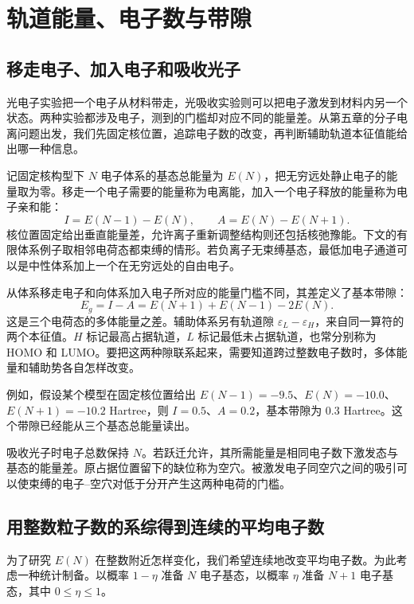 \chapter{轨道能量、电子数与带隙}
\section{移走电子、加入电子和吸收光子}
光电子实验把一个电子从材料带走，光吸收实验则可以把电子激发到材料内另一个状态。两种实验都涉及电子，测到的门槛却对应不同的能量差。从第五章的分子电离问题出发，我们先固定核位置，追踪电子数的改变，再判断辅助轨道本征值能给出哪一种信息。

记固定核构型下 $N$ 电子体系的基态总能量为 $E(N)$，把无穷远处静止电子的能量取为零。移走一个电子需要的能量称为电离能，加入一个电子释放的能量称为电子亲和能：
\begin{equation}
I=E(N-1)-E(N),\qquad A=E(N)-E(N+1).
\end{equation}
核位置固定给出垂直能量差，允许离子重新调整结构则还包括核弛豫能。下文的有限体系例子取相邻电荷态都束缚的情形。若负离子无束缚基态，最低加电子通道可以是中性体系加上一个在无穷远处的自由电子。

从体系移走电子和向体系加入电子所对应的能量门槛不同，其差定义了基本带隙：
\begin{equation}\label{spectra:gap}
E_g=I-A=E(N+1)+E(N-1)-2E(N).
\end{equation}
这是三个电荷态的多体能量之差。辅助体系另有轨道隙 $\varepsilon_L-\varepsilon_H$，来自同一算符的两个本征值。$H$ 标记最高占据轨道，$L$ 标记最低未占据轨道，也常分别称为 HOMO 和 LUMO。要把这两种隙联系起来，需要知道跨过整数电子数时，多体能量和辅助势各自怎样改变。

例如，假设某个模型在固定核位置给出 $E(N-1)=-9.5$、$E(N)=-10.0$、$E(N+1)=-10.2$ Hartree，则 $I=0.5$、$A=0.2$，基本带隙为 $0.3$ Hartree。这个带隙已经能从三个基态总能量读出。

吸收光子时电子总数保持 $N$。若跃迁允许，其所需能量是相同电子数下激发态与基态的能量差。原占据位置留下的缺位称为空穴。被激发电子同空穴之间的吸引可以使束缚的电子--空穴对低于分开产生这两种电荷的门槛。

\section{用整数粒子数的系综得到连续的平均电子数}
为了研究 $E(N)$ 在整数附近怎样变化，我们希望连续地改变平均电子数。为此考虑一种统计制备。以概率 $1-\eta$ 准备 $N$ 电子基态，以概率 $\eta$ 准备 $N+1$ 电子基态，其中 $0\le\eta\le1$。

